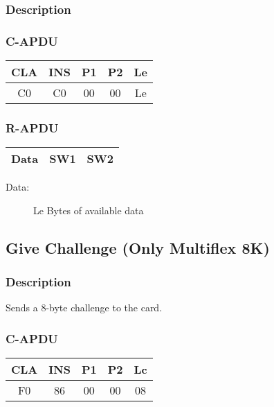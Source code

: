 \documentclass[a4paper,oneside]{article}
\begin{document}
\subsubsection*{Description}

\subsubsection*{C-APDU}

\begin{tabular}{|c|c|c|c|c|} \hline
CLA & INS & P1 & P2 & Le \\ \hline \hline
C0 & C0 & 00 & 00 & Le \\ \hline
\end{tabular}

\subsubsection*{R-APDU}

\begin{tabular}{|c|c|c|} \hline
Data & SW1 & SW2 \\ \hline
\end{tabular}

\begin{description}
\item[Data:] Le Bytes of available data
\end{description}


\subsection{Give Challenge (Only Multiflex 8K)}

\subsubsection*{Description}

Sends a 8-byte challenge to the card.

\subsubsection*{C-APDU}

\begin{tabular}{|c|c|c|c|c|} \hline
CLA & INS & P1 & P2 & Lc \\ \hline \hline
F0 & 86 & 00 & 00 & 08 \\ \hline
\end{tabular}
\end{document}

